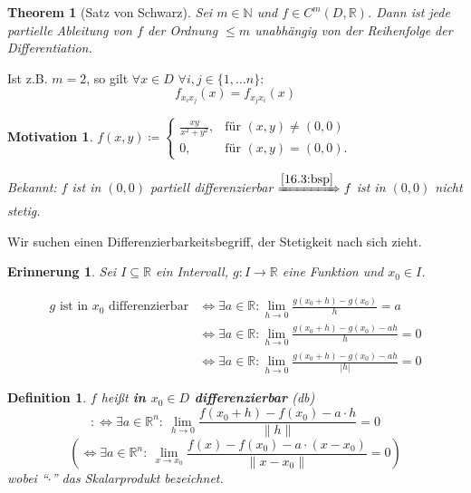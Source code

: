 \documentclass[12pt]{extreport} %
\newcommand{\N}{\mathbb{N}}
\newcommand{\R}{\mathbb{R}}
\theoremstyle{named}
\newtheorem{unnamedtheorem}{Theorem} \counterwithin{unnamedtheorem}{chapter}
\theoremstyle{nnamed}
\theoremstyle{itshape}
\newtheorem*{definition}{Definition}
\theoremstyle{normal}
\newtheorem*{motivation}{Motivation}
\newtheorem*{erinnerung}{Erinnerung}
\begin{document}
\begin{unnamedtheorem}[Satz von Schwarz] \label{18.1:satz}
	Sei $m \in \N$ und $f \in C^{m}(D, \R)$. Dann ist jede partielle Ableitung von $f$ der Ordnung $\leq m$ unabhängig von der Reihenfolge der Differentiation.
\end{unnamedtheorem}

Ist z.B. $m = 2$, so gilt $\forall x \in D$ $\forall i, j \in \{1, \dotsc n\}$:
	$$ f_{x_{i} x_{j}} (x) = f_{x_{j} x_{i}}(x) $$

\begin{motivation}
	$f(x, y) \coloneqq \begin{cases} \frac{xy}{x^{2} + y^{2}}, & \text{für } (x, y) \neq (0, 0) \\ 0, & \text{für } (x, y) = (0, 0). \end{cases}$ 
	
	\bigskip
	
	Bekannt: $f$ ist in $(0, 0)$ partiell differenzierbar $\xRightarrow[]{\ref{16.3:bsp}} f$ ist in $(0,0)$ nicht stetig.
\end{motivation}

Wir suchen einen Differenzierbarkeitsbegriff, der Stetigkeit nach sich zieht.

\begin{erinnerung}
	Sei $I \subseteq \R$ ein Intervall, $g \colon I \rightarrow \R$ eine Funktion und $x_{0} \in I$.
	
	\begin{align*}
		\text{$g$ ist in $x_{0}$ differenzierbar} & \iff \exists a \in \R: \lim_{h \rightarrow 0} \frac{g(x_{0} + h) - g(x_{0})}{h} = a \\
		& \iff \exists a \in \R: \lim_{h \rightarrow 0} \frac{g(x_{0} + h) - g(x_{0}) - a h}{h} = 0 \\
		& \iff \exists a \in \R: \lim_{h \rightarrow 0} \frac{g(x_{0} + h) - g(x_{0}) - ah}{|h|} = 0
	\end{align*}	
\end{erinnerung}

\begin{definition}
	$f$ hei{\ss}t \textbf{in $x_{0} \in D$ differenzierbar} (db)
	$$ :\iff \exists a \in \R^{n}: ~ \lim_{h \rightarrow 0} \frac{f(x_{0} + h) - f(x_{0}) - a \cdot h}{\| h \|} = 0 $$
	$$ \left( \iff \exists a \in \R^{n}: ~\lim_{x \rightarrow x_{0}} \frac{f(x) - f(x_{0}) - a \cdot (x - x_{0})}{\| x - x_{0} \|} = 0 \right) $$
	wobei \enquote{$\cdot$} das Skalarprodukt bezeichnet.
\end{definition}
\end{document}
